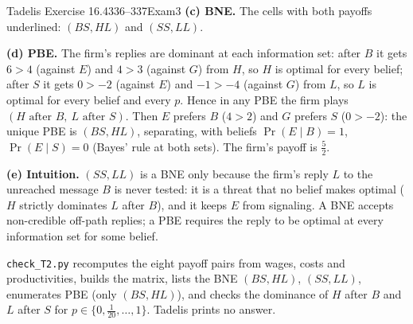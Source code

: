 \begin{exsol}{Tadelis Exercise 16.4}{336--337}{Exam}{3}
\textbf{(c) BNE.} The cells with both payoffs underlined: $(BS, HL)$ and $(SS, LL)$.

\textbf{(d) PBE.} The firm's replies are dominant at each information set: after $B$ it gets $6 > 4$ (against
$E$) and $4 > 3$ (against $G$) from $H$, so $H$ is optimal for every belief; after $S$ it gets $0 > -2$
(against $E$) and $-1 > -4$ (against $G$) from $L$, so $L$ is optimal for every belief and every $p$.
Hence in any PBE the firm plays $(H \text{ after } B,\ L \text{ after } S)$. Then $E$ prefers $B$ ($4 > 2$) and
$G$ prefers $S$ ($0 > -2$): the unique PBE is $(BS, HL)$, separating, with beliefs $\Pr(E \mid B) = 1$,
$\Pr(E \mid S) = 0$ (Bayes' rule at both sets). The firm's payoff is $\frac52$.

\textbf{(e) Intuition.} $(SS, LL)$ is a BNE only because the firm's reply $L$ to the unreached message
$B$ is never tested: it is a threat that no belief makes optimal ($H$ strictly dominates $L$ after $B$),
and it keeps $E$ from signaling. A BNE accepts non-credible off-path replies; a PBE requires the reply
to be optimal at every information set for some belief.

\verify \texttt{check\_T2.py} recomputes the eight payoff pairs from wages, costs and productivities,
builds the matrix, lists the BNE $(BS, HL)$, $(SS, LL)$, enumerates PBE (only $(BS, HL)$), and checks
the dominance of $H$ after $B$ and $L$ after $S$ for $p \in \{0, \frac1{20}, \dots, 1\}$. Tadelis prints
no answer.

\end{exsol}
